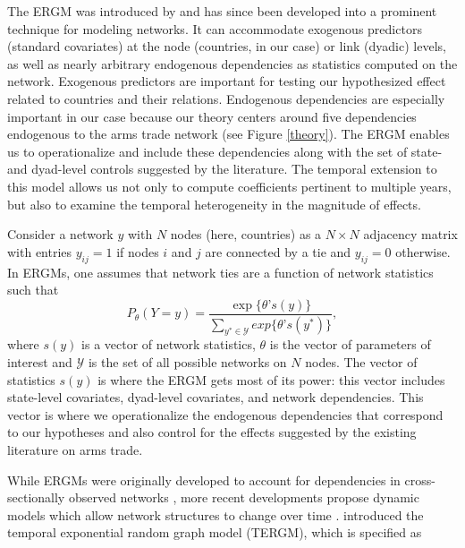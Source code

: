 \documentclass[12pt, letterpaper]{article}
\numberwithin{equation}{section}
\begin{document}
The ERGM was introduced by \citet{art:Wasserman1996} and has since been developed into a prominent technique for modeling networks. 
It can accommodate exogenous predictors (standard covariates) at the node (countries, in our case) or link (dyadic) levels, as well as nearly arbitrary endogenous dependencies as statistics computed on the network. 
Exogenous predictors are important for testing our hypothesized effect related to countries and their relations. 
Endogenous dependencies are especially important in our case because our theory centers around five dependencies endogenous to the arms trade network (see Figure \ref{theory}). 
The ERGM enables us to operationalize and include these dependencies along with the set of state- and dyad-level controls suggested by the literature. 
The temporal extension to this model allows us not only to compute coefficients pertinent to multiple years, but also to examine the temporal heterogeneity in the magnitude of effects. 

Consider a network $y$ with $N$ nodes (here, countries) as a $N\times N$ adjacency matrix with entries $y_{ij} = 1$ if nodes $i$ and $j$ are connected by a tie and $y_{ij} = 0$ otherwise. 
In ERGMs, one assumes that network ties are a function of network statistics such that 
\begin{equation*}
\label{eq:edgesundir}
P_{\theta}(Y=y) = \frac{\exp \bigl\{\theta’ s(y) \bigr\}}{\sum_{y^* \in \mathcal{Y} }exp\bigl\{\theta’s(y^*)\bigl\}},
\end{equation*}
where $s(y)$ is a vector of network statistics, $\theta$ is the vector of parameters of interest and $\mathcal{Y}$ is the set of all possible networks on $N$ nodes. 
The vector of statistics $s(y)$ is where the ERGM gets most of its power: this vector includes state-level covariates, dyad-level covariates, and network dependencies. 
This vector is where we operationalize the endogenous dependencies that correspond to our hypotheses and also control for the effects suggested by the existing literature on arms trade. 
  
While ERGMs were originally developed to account for dependencies in cross-sectionally observed networks \citep{art:Snijders2002}, more recent developments propose dynamic models which allow network structures to change over time \citep{HaFuXi:10}. 
\cite{HaFuXi:10} introduced the temporal exponential random graph model (TERGM), which is specified as 
\end{document}
